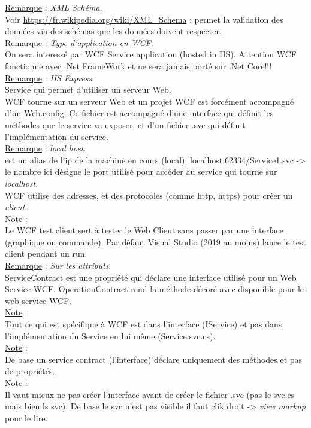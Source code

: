 \documentclass[a4paper,12pt,twoside]{article}
\newcommand{\rem}[2]{\noindent\underline{Remarque} : \textit{#1}.\\ \indent #2}
\newcommand{\note}[1]{\noindent\underline{Note} : \\ \indent #1}
\begin{document}
\rem{XML Schéma}{ Voir \url{https://fr.wikipedia.org/wiki/XML_Schema} : permet la validation des données via des schémas que les données doivent respecter.}\\

\rem{Type d'application en WCF}{On sera interessé par WCF Service application (hosted in IIS). Attention WCF fonctionne avec .Net FrameWork et ne sera jamais porté sur .Net Core!!!}\\

\rem{IIS Express}{ Service qui permet d'utiliser un serveur Web.}\\

WCF tourne sur un serveur Web et un projet WCF est forcément accompagné d'un Web.config.  Ce fichier est accompagné d'une interface qui définit les méthodes que le service va exposer, et d'un fichier .svc qui définit l'implémentation du service.\\

\rem{local host}{est un alias de l'ip de la machine en cours (local). localhost:62334/Service1.svc -> le nombre ici désigne le port utilisé pour accéder au service qui tourne sur \textit{localhost}.}\\

WCF utilise des adresses, et des protocoles (comme http, https) pour créer un \textit{client}.\\

\note{Le WCF test client sert à tester le Web Client sans passer par une interface (graphique ou commande). Par défaut Visual Studio (2019 au moins) lance le test client pendant un run.}\\

\rem{Sur les attributs}{ServiceContract est une propriété qui déclare une interface utilisé pour un Web Service WCF. OperationContract rend la méthode décoré avec disponible pour le web service WCF.}\\

\note{Tout ce qui est spécifique à WCF est dans l'interface (IService) et pas dans l'implémentation du Service en lui même (Service.svc.cs).}\\

\note{De base un service contract (l'interface) déclare uniquement des méthodes et pas de propriétés.}\\

\note{Il vaut mieux ne pas créer l'interface avant de créer le fichier .svc (pas le svc.cs mais bien ls svc). De base le svc n'est pas visible il faut clik droit -> \textit{view markup} pour le lire.}\\
\end{document}
